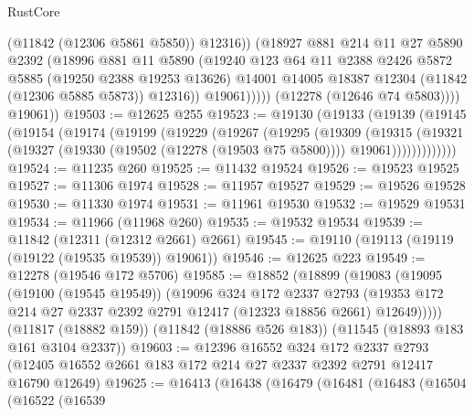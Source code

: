 \begin{lexlean}{RustCore}
\begin{coremodule}
                        (@11842 (@12306 @5861 @5850))
                        @12316))
                    (@18927
                      @881
                      @214
                      @11
                      @27
                      @5890
                      @2392
                      (@18996
                        @881
                        @11
                        @5890
                        (@19240
                          @123
                          @64
                          @11
                          @2388
                          @2426
                          @5872
                          @5885
                          (@19250 @2388 @19253 @13626)
                          @14001
                          @14005
                          @18387
                          @12304
                          (@11842 (@12306 @5885 @5873))
                          @12316))
                      @19061)))))
            (@12278 (@12646 @74 @5803))))
        @19061))
@19503 := @12625 @255
@19523 := @19130
    (@19133
      (@19139
        (@19145
          (@19154
            (@19174
              (@19199
                (@19229
                  (@19267
                    (@19295
                      (@19309
                        (@19315
                          (@19321
                            (@19327
                              (@19330 (@19502 (@12278 (@19503 @75 @5800))))
                              @19061)))))))))))))
@19524 := @11235 @260
@19525 := @11432 @19524
@19526 := @19523 @19525
@19527 := @11306 @1974
@19528 := @11957 @19527
@19529 := @19526 @19528
@19530 := @11330 @1974
@19531 := @11961 @19530
@19532 := @19529 @19531
@19534 := @11966 (@11968 @260)
@19535 := @19532 @19534
@19539 := @11842 (@12311 (@12312 @2661) @2661)
@19545 := @19110 (@19113 (@19119 (@19122 (@19535 @19539)) @19061))
@19546 := @12625 @223
@19549 := @12278 (@19546 @172 @5706)
@19585 := @18852
    (@18899
      (@19083
        (@19095
          (@19100 (@19545 @19549))
          (@19096
            @324
            @172
            @2337
            @2793
            (@19353 @172 @214 @27 @2337 @2392 @2791 @12417 (@12323 @18856 @2661) @12649)))))
    (@11817 (@18882 @159))
    (@11842 (@18886 @526 @183))
    (@11545 (@18893 @183 @161 @3104 @2337))
@19603 := @12396
    @16552
    @324
    @172
    @2337
    @2793
    (@12405 @16552 @2661 @183 @172 @214 @27 @2337 @2392 @2791 @12417 @16790 @12649)
@19625 := @16413
    (@16438
      (@16479
        (@16481
          (@16483
            (@16504
              (@16522
                (@16539

\end{coremodule}
\end{lexlean}
